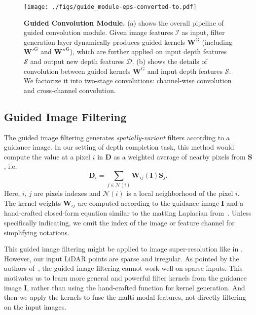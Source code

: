 \documentclass[journal]{IEEEtran}
\begin{document}
\begin{figure*}
\begin{center}
\texttt{[image: ./figs/guide\_module-eps-converted-to.pdf]}
\end{center}
   \caption{{\bf Guided Convolution Module.}
   (a) shows the overall pipeline of guided convolution module.
   Given image features $\mathcal{I}$ as input, filter generation layer dynamically produces guided kernels $\mathbf{W}^\mathrm{G}$
   (including $\mathbf{W'}^\mathrm{G}$ and $\mathbf{W''}^\mathrm{G}$),
   which are further applied on input depth features $\mathcal{S}$ and output new depth features $\mathcal{D}$.
   (b) shows the details of convolution between guided kernels $\mathbf{W}^\mathrm{G}$ and input depth features $\mathcal{S}$.
   We factorize it into two-stage convolutions: channel-wise convolution and cross-channel convolution.}
   \label{fig:guide_module}
\end{figure*}

\subsection{Guided Image Filtering}
\label{subsec:guided_filtering}
The guided image filtering\cite{guided_filter} generates \emph{spatially-variant} filters according to a guidance image.
In our setting of depth completion task, this method would compute the value at a pixel $i$ in $\mathbf{D}$ as a weighted average of nearby pixels from $\mathbf{S}$, i.e.
\begin{equation} \label{eq:guided_avg}
\mathbf{D}_i = \sum_{j \in \mathcal{N}(i)} \mathbf{W}_{ij}(\mathbf{I})\mathbf{S}_j.
\end{equation}
Here, $i$, $j$ are pixels indexes and $\mathcal{N}(i)$ is a local neighborhood of the pixel $i$.
The kernel weights $\mathbf{W}_{ij}$ are computed according to the guidance image $\mathbf{I}$ and a hand-crafted closed-form equation similar to the matting Laplacian from~\cite{close_form_matting}.
Unless specifically indicating, we omit the index of the image or feature channel for simplifying notations.


This guided image filtering might be applied to image super-resolution like in \cite{joint_geodesic_upsampling}.
However, our input LiDAR points are sparse and irregular. 
As pointed by the authors of~\cite{guided_filter_conf}, the guided image filtering cannot work well on sparse inputs.
This motivates us to learn more general and powerful filter kernels from the guidance image $\mathbf{I}$, rather than using the hand-crafted function for kernel generation.
And then we apply the kernels to fuse the multi-modal features, not directly filtering on the input images.
\end{document}
